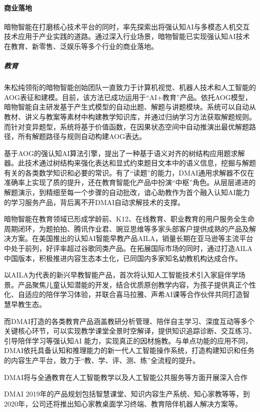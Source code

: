 \documentclass[letterpaper,11pt,english]{sphinxmanual}
\begin{document}
\paragraph{商业落地}
\label{\detokenize{chapter_dive/dm-ai:id8}}
暗物智能在打磨核心技术平台的同时，率先探索出将强认知AI与多模态人机交互技术应用于产业实践的道路。通过深入行业场景，暗物智能已实现强认知AI技术在教育、新零售、泛娱乐等多个行业的商业落地。


\subparagraph{教育}
\label{\detokenize{chapter_dive/dm-ai:id9}}
朱松纯领衔的暗物智能创始团队一直致力于计算机视觉、机器人技术和人工智能的AOG表征和建模。目前，该方法已成功运用于“AI+教育”产品。依托AOG模型，暗物智能自主研发基于产生式模型的自动出题、解题与讲题模块。系统可以自动从教材、讲义与教案等素材中构建教学知识库，并通过归纳学习方法获取解题规则。而针对变异题型，系统将基于价值函数，在因果状态空间中自动推演出最优解题路径，所有解题路径与规则自动构建AOG表达。

基于AOG的强认知AI算法引擎，提出了一种基于语义对齐的树结构应用题求解器。此技术通过树结构来强化表达和显式约束题目文本中的语义信息，挖掘与解题有关的各类数学知识和必要的常识。有了“读题”的能力，DMAI通用求解器不仅在准确率上实现了质的提升，还在教育智能化产品中扮演“中枢”角色。从层层递进的解题演示，到精细至每一个步骤的自动批改，谙心助教作为首个融入认知AI能力的学习服务产品，背后离不开DMAI自动求解技术的支撑。

暗物智能在教育领域已形成学龄前、K12、在线教育、职业教育的用户服务全生命周期闭环，为题拍拍、腾讯作业君、豌豆思维等多家头部客户提供成熟的产品及解决方案。在美国推出的认知AI智能早教产品AILA，销量长期在亚马逊等主流平台中处于前列，好评率超过谷歌同类产品。在拓展国际市场的同时，通过打造AILA中国版本，积极推进内容生态本土化，已同国内多家知名幼教机构达成合作。

以AILA为代表的新兴早教智能产品，首次将认知人工智能技术引入家庭伴学场景。产品聚焦儿童认知潜能的开发，结合优质原创教学内容，为孩子提供真正个性化、自适应的陪伴学习体验，并联合喜马拉雅、声希AI课等合作伙伴共同打造智慧早教生态。

而DMAI打造的各类教育产品涵盖教研分析管理、陪伴自主学习、深度互动等多个关键核心环节，可以实现教学课堂全景时空解译，提供知识追踪诊断、交互练习、引导陪伴学习等强认知AI
能力，实现真正的因材施教。与单点功能的应用不同，DMAI依托具备认知和推理能力的新一代人工智能操作系统，打造构建知识和任务的内容生产平台，致力于“教、学、评、测、练”全流程的提升。

DMAI将与全通教育在人工智能教学以及人工智能公共服务等方面开展深入合作

DMAI
2019年的产品规划包括智慧课堂、知识内容生产系统、知心家教等等，到2020年，公司还将推出知心家教桌面学习终端、教育陪伴机器人解决方案等。
\end{document}
